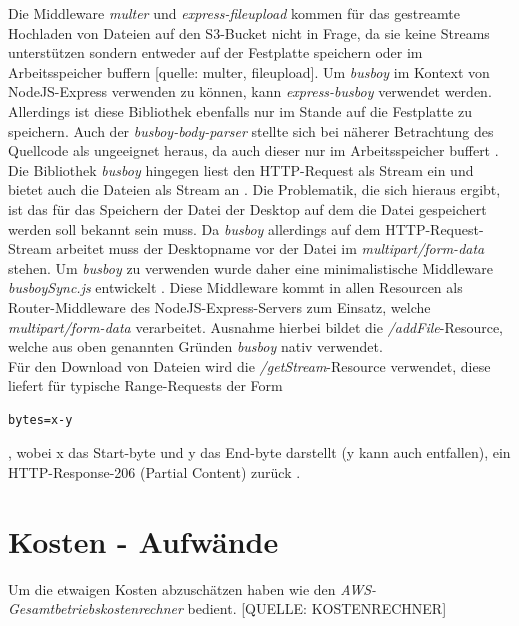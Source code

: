 \documentclass[a4paper, 12pt]{scrreprt}
\renewcommand\_{\textunderscore\allowbreak}
\begin{document}
\noindent Die Middleware \textit{multer} und \textit{express-fileupload} kommen für das gestreamte Hochladen von Dateien auf den S3-Bucket nicht in Frage, da sie keine Streams unterstützen sondern entweder auf der Festplatte speichern  oder im Arbeitsspeicher buffern [quelle: multer, fileupload].
Um \textit{busboy} im Kontext von NodeJS-Express verwenden zu können, kann \textit{express-busboy} verwendet werden. Allerdings ist diese Bibliothek ebenfalls nur im Stande auf die Festplatte zu speichern. Auch der \textit{busboy-body-parser} stellte sich bei näherer Betrachtung des Quellcode als ungeeignet heraus, da auch dieser nur im Arbeitsspeicher buffert \cite{LeonardMartin}.\\
Die Bibliothek \textit{busboy} hingegen liest den HTTP-Request als Stream ein und bietet auch die Dateien als Stream an \cite{busboy}.
Die Problematik, die sich hieraus ergibt, ist das für das Speichern der Datei der Desktop auf dem die Datei gespeichert werden soll bekannt sein muss. Da \textit{busboy} allerdings auf dem HTTP-Request-Stream arbeitet muss der Desktopname vor der Datei im \textit{multipart/form-data} stehen. Um \textit{busboy} zu verwenden wurde daher eine minimalistische Middleware \textit{busboySync.js} entwickelt \cite{Express}.
Diese Middleware kommt in allen Resourcen als Router-Middleware des NodeJS-Express-Servers zum Einsatz, welche \textit{multipart/form-data} verarbeitet. Ausnahme hierbei bildet die \textit{/addFile}-Resource, welche aus oben genannten Gründen \textit{busboy} nativ verwendet.\\
Für den Download von Dateien wird die \textit{/getStream}-Resource verwendet, diese liefert für typische Range-Requests der Form
\begin{lstlisting}
bytes=x-y
\end{lstlisting}
, wobei x das Start-byte und y das End-byte darstellt (y kann auch entfallen), ein HTTP-Response-206 (Partial Content) zurück \cite{HTP}.


\chapter{Kosten - Aufwände}
Um die etwaigen Kosten abzuschätzen haben wie den \textit{AWS-Gesamtbetriebskostenrechner} bedient. [QUELLE: KOSTENRECHNER] 
\end{document}
